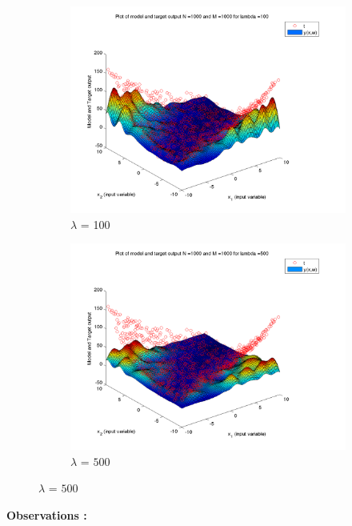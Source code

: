 \documentclass{article}
\begin{document}
\begin{figure}[H]
\begin{subfigure}{.5\textwidth}
\centering
\includegraphics[width=\linewidth]{D2/Varyinglambda_N1000M1000lambda100}
\caption{$\lambda$ = 100}
\end{subfigure}
\begin{subfigure}{.5\textwidth}
\includegraphics[width=\linewidth]{D2/Varyinglambda_N1000M1000lambda500}
\caption{$\lambda$ = $500$}
\end{subfigure}

\end{figure}


\textbf{Observations :}
\end{document}
